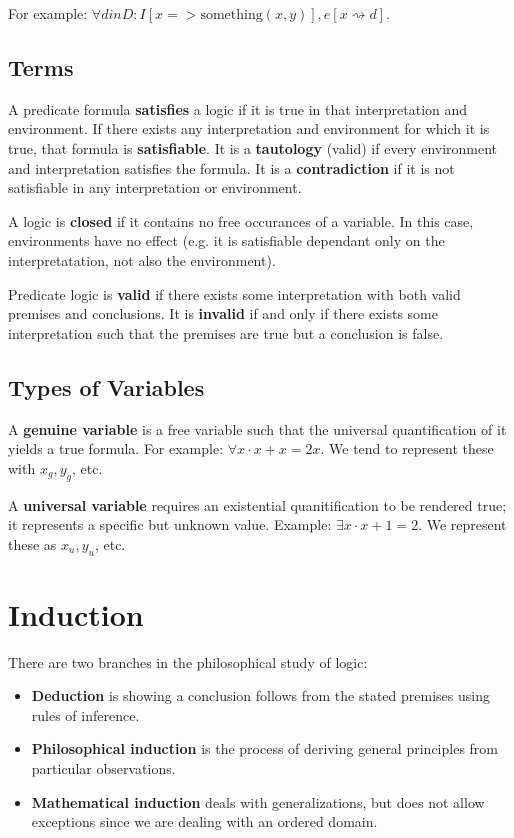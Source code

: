\documentclass[12pt]{article}
\begin{document}
For example: $\forall d in D : I[x => \text{something}(x,y)], e[x \rightsquigarrow d]$.

\subsection*{Terms}
A predicate formula {\bf satisfies} a logic if it is true in that interpretation and environment. If there exists any interpretation and environment for which it is true, that formula is {\bf satisfiable}. It is a {\bf tautology} (valid) if every environment and interpretation satisfies the formula. It is a {\bf contradiction} if it is not satisfiable in any interpretation or environment.

A logic is {\bf closed} if it contains no free occurances of a variable. In this case, environments have no effect (e.g. it is satisfiable dependant only on the interpretatation, not also the environment).

Predicate logic is {\bf valid} if there exists some interpretation with both valid premises and conclusions. It is {\bf invalid} if and only if there exists some interpretation such that the premises are true but a conclusion is false.

\subsection*{Types of Variables}
A {\bf genuine variable} is a free variable such that the universal quantification of it yields a true formula. For example: $\forall x \cdot x + x = 2x$. We tend to represent these with $x_g, y_g$, etc.

A {\bf universal variable} requires an existential quanitification to be rendered true; it represents a specific but unknown value. Example: $\exists x \cdot x + 1 = 2$. We represent these as $x_u, y_u$, etc.

\section*{Induction}
There are two branches in the philosophical study of logic:
\begin{itemize}
\item {\bf Deduction} is showing a conclusion follows from the stated premises using rules of inference.
\item {\bf Philosophical induction} is the process of deriving general principles from particular observations.
\item {\bf Mathematical induction} deals with generalizations, but does not allow exceptions since we are dealing with an ordered domain.
\end{itemize}
\end{document}
